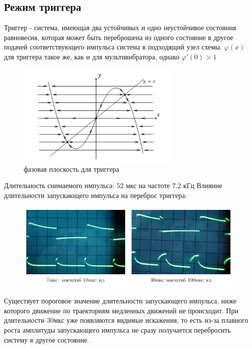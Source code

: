 \documentclass[a4paper,14pt]{extarticle}
\begin{document}
\subsection{Режим триггера}
Триггер - система, имеющая два устойчивых и одно неустойчивое состояния равновесия, которая может быть переброшена из одного состояние в другое подачей соответствующего импульса система в подходящий узел схемы. 
$\varphi(x)$ для триггера такое же, как и для мультивибратора, однако $\varphi'(0)>1$
\begin{figure}[H]
	\centering
	\includegraphics[width=0.7\textwidth]{photo/trigger}
	\caption{фазовая плоскость для триггера}
	\label{fig:figure2}
\end{figure}


Длительность снимаемого импульса: $52$ мкс на частоте $7.2$ кГц
Влияние длительности запускающего импульса на переброс триггера:
   \begin{figure}[H]
    \centering
       \includegraphics[width=1\textwidth]{plot/ris2}
       \vspace{-1.4em}
     \caption{}
     \label{fig:dummy}
	\end{figure}

Существует пороговое значение длительности запускающего импульса, ниже которого движение по траекториям медленных движений не происходит. При длительности 30мкс уже появляются видимые искажения, то есть из-за плавного роста амплитуды запускающего импульса не сразу получается перебросить систему в другое состояние.
\end{document}
